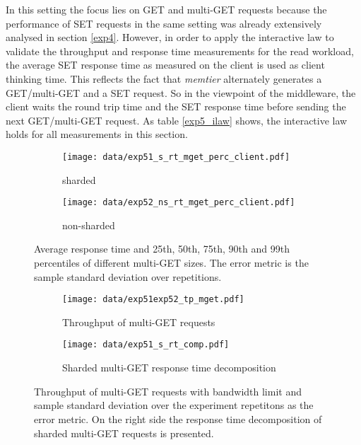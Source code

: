 \documentclass[report.tex]{subfiles}
\begin{document}
In this setting the focus lies on GET and multi-GET requests because the performance of SET requests in the same setting was already extensively analysed in section \ref{exp4}.
However, in order to apply the interactive law to validate the throughput and response time measurements for the read workload, the average SET response time as measured on the client is used as client thinking time. This reflects the fact that \emph{memtier} alternately generates a GET/multi-GET and a SET request. So in the viewpoint of the middleware, the client waits the round trip time and the SET response time before sending the next GET/multi-GET request. As table \ref{exp5_ilaw} shows, the interactive law holds for all measurements in this section.

\begin{figure}[H]
	\begin{subfigure}[b]{.49\linewidth}
		\centering
		\texttt{[image: data/exp51\_s\_rt\_mget\_perc\_client.pdf]}
		\caption{sharded}\label{exp51_s_rt_mget_perc}
	\end{subfigure}\hfill
	\begin{subfigure}[b]{.49\linewidth}
		\centering
		\texttt{[image: data/exp52\_ns\_rt\_mget\_perc\_client.pdf]}
		\caption{non-sharded}\label{exp52_ns_rt_mget_perc}
	\end{subfigure}%
	\caption{Average response time and 25th, 50th, 75th, 90th and 99th percentiles of different multi-GET sizes. The error metric is the sample standard deviation over repetitions.}\label{exp5_rt_mget_perc}
\end{figure}


\begin{figure}[H]
	\begin{subfigure}[b]{.49\linewidth}
		\centering
		\texttt{[image: data/exp51exp52\_tp\_mget.pdf]}
		\caption{Throughput of multi-GET requests }\label{exp5_tp}
	\end{subfigure}\hfill
	\begin{subfigure}[b]{.49\linewidth}
		\centering
		\texttt{[image: data/exp51\_s\_rt\_comp.pdf]}
		\caption{Sharded multi-GET response time decomposition}\label{exp51_s_rt_comp}
	\end{subfigure}%
	\caption{Throughput of multi-GET requests with bandwidth limit and sample standard deviation over the experiment repetitons as the error metric. On the right side  the response time decomposition of sharded multi-GET requests is presented.}
\end{figure}
\end{document}
